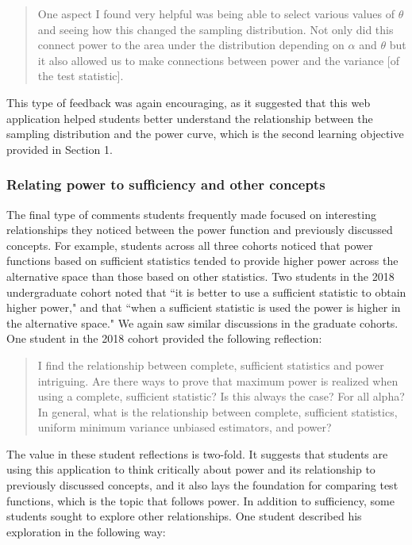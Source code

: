 \documentclass{TISE}
\begin{document}
\begin{quote}
	One aspect I found very helpful was being able to select various values of $\theta$ and seeing how this changed the sampling distribution. Not only did this connect power to the area under the distribution depending on $\alpha$ and $\theta$ but it also allowed us to make connections between power and the variance [of the test statistic]. 
\end{quote}

This type of feedback was again encouraging, as it suggested that this web application helped students better understand the relationship between the sampling distribution and the power curve, which is the second learning objective provided in Section 1. 

\subsubsection{Relating power to sufficiency and other concepts}

The final type of comments students frequently made focused on interesting relationships they noticed between the power function and previously discussed concepts. For example, students across all three cohorts noticed that power functions based on sufficient statistics tended to provide higher power across the alternative space than those based on other statistics. Two students in the 2018 undergraduate cohort noted that ``it is better to use a sufficient statistic to obtain higher power," and that ``when a sufficient statistic is used the power is higher in the alternative space." We again saw similar discussions in the graduate cohorts. One student in the 2018 cohort provided the following reflection:

\begin{quote}
	I find the relationship between complete, sufficient statistics and power intriguing. Are there ways to prove that maximum power is realized when using a complete, sufficient statistic? Is this always the case? For all alpha? In general, what is the relationship between complete, sufficient statistics, uniform minimum variance unbiased estimators, and power?
\end{quote}

The value in these student reflections is two-fold. It suggests that students are using this application to think critically about power and its relationship to previously discussed concepts, and it also lays the foundation for comparing test functions, which is the topic that follows power. In addition to sufficiency, some students sought to explore other relationships. One student described his exploration in the following way:
\end{document}
